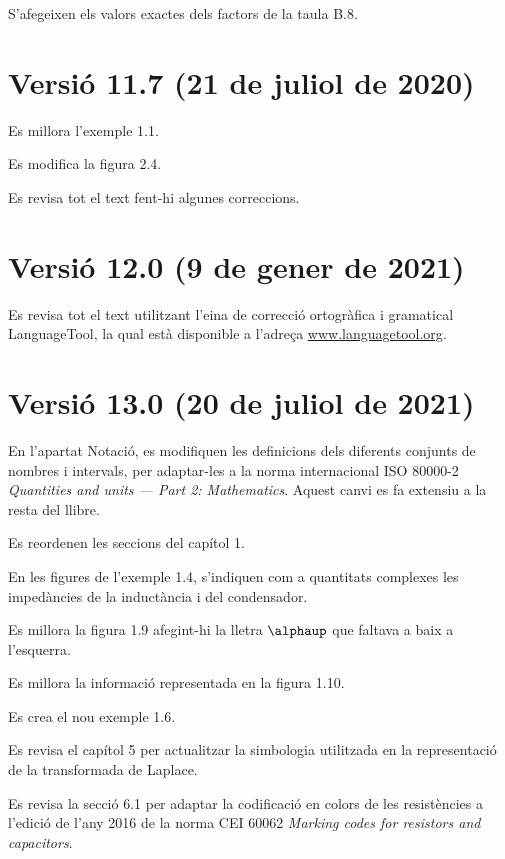 S'afegeixen els valors exactes dels factors de la taula B.8.


\section*{Versió 11.7 (21 de juliol de 2020)}

Es millora l'exemple 1.1.

Es modifica la figura 2.4.

Es revisa tot el text fent-hi algunes correccions.


\section*{Versió 12.0 (9 de gener de 2021)}

Es revisa tot el text utilitzant l'eina de correcció ortogràfica i gramatical \textsf{LanguageTool}, la qual està disponible a l'adreça \href{https://www.languagetool.org}{www.languagetool.org}.


\section*{Versió 13.0 (20 de juliol de 2021)}

En l'apartat Notació, es modifiquen les definicions dels diferents conjunts de nombres i intervals, per adaptar-les a la norma internacional ISO 80000-2 \textit{Quantities and units --- Part 2: Mathematics}. Aquest canvi es fa extensiu a la resta del llibre.

Es reordenen les seccions del capítol 1.

En les figures de l'exemple 1.4, s'indiquen com a quantitats complexes les impedàncies de la inductància i del condensador.

Es millora la figura 1.9 afegint-hi la lletra $\alphaup$ que faltava  a baix a l'esquerra.

Es millora la informació representada en la figura 1.10.

Es crea el nou exemple 1.6.

Es revisa el capítol 5 per actualitzar la simbologia utilitzada en la representació de la transformada de Laplace.

Es revisa la secció 6.1 per adaptar la codificació en colors de les resistències a l'edició de l'any 2016 de la norma CEI 60062 \textit{Marking codes for resistors and capacitors}.

